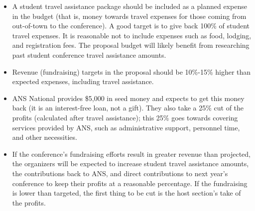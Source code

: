\documentclass[12pt]{article}
\begin{document}
\begin{itemize}
\item{A student travel assistance package should be included as a planned expense in the budget (that is, money towards travel expenses for those coming from out-of-town to the conference). A good target is to give back 100\% of student travel expenses. It is reasonable not to include expenses such as food, lodging, and registration fees.} The proposal budget will likely benefit from researching past student conference travel assistance amounts.
\item{Revenue (fundraising) targets in the proposal should be 10\%-15\% higher than expected expenses, including travel assistance.}
\item{ANS National provides \$5,000 in seed money and expects to get this money back (it is an interest-free loan, not a gift)}. They also take a 25\% cut of the profits (calculated after travel assistance); this 25\% goes towards covering services provided by ANS, such as administrative support, personnel time, and other necessities.
\item{If the conference's fundraising efforts result in greater revenue than projected, the organizers will be expected to increase student travel assistance amounts, the contributions back to ANS, and direct contributions to next year’s conference to keep their profits at a reasonable percentage. If the fundraising is lower than targeted, the first thing to be cut is the host section’s take of the profits.}
\end{itemize}
\end{document}
